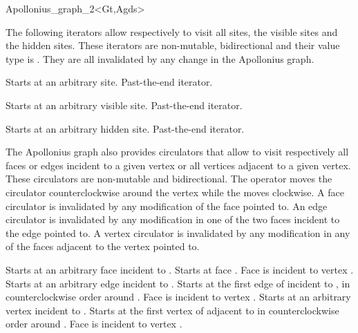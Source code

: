 \begin{ccRefClass}{Apollonius_graph_2<Gt,Agds>}

The following iterators allow respectively to visit 
all sites, the visible sites and the hidden sites.
These iterators are non-mutable, bidirectional and their value type
is . They are all invalidated by any change in the
Apollonius graph.


{Starts at an arbitrary site.}
\ccGlue
{}
{Past-the-end iterator.}

{Starts at an arbitrary visible site.}
\ccGlue
{}
{Past-the-end iterator.}

{Starts at an arbitrary hidden site.}
\ccGlue
{}
{Past-the-end iterator.}


\ccThreeToTwo




The Apollonius graph also provides circulators that allow to visit 
respectively all faces or edges incident to a given vertex
or all vertices adjacent to a given vertex.
These circulators are non-mutable and bidirectional.
 The operator  moves the circulator
counterclockwise around the vertex while
the  moves clockwise.
A face circulator is invalidated by any modification of the face
pointed to.
An edge circulator is invalidated by any modification
in one of the two faces incident to the edge pointed to.
A vertex circulator is invalidated by any modification
in any of the faces adjacent to the vertex pointed to.

{Starts at an arbitrary face incident
to .}
\ccGlue
{}
{Starts at face .
\ccPrecond Face  is incident to vertex .}
\ccGlue
{}
{Starts at an arbitrary edge incident
to .}
\ccGlue
{}
{Starts at the first edge of  incident to 
, in counterclockwise order around .
\ccPrecond Face  is incident to vertex .}
\ccGlue
{}
{Starts at an arbitrary  vertex incident
to .}
\ccGlue
{}
{Starts at the first vertex of  adjacent  to 
in  counterclockwise order around .
\ccPrecond Face  is incident to vertex .}




\end{ccRefClass}
